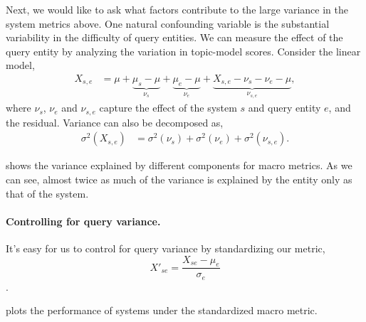 Next, we would like to ask what factors contribute to the large variance in the system metrics above.
One natural confounding variable is the substantial variability in the difficulty of query entities.
We can measure the effect of the query entity by analyzing the variation in topic-model scores.
Consider the linear model,
\begin{align*}
  X_{s,e} &= \mu 
    + \underbrace{\mu_{s} - \mu}_{\nu_{s}}
    + \underbrace{\mu_{e} - \mu}_{\nu_{e}}
    + \underbrace{X_{s,e} - \nu_{s} - \nu_{e} - \mu}_{\nu_{s,e}},
\end{align*}
where $\nu_{s}$, $\nu_{e}$ and $\nu_{s,e}$ capture the effect of the system $s$ and query entity $e$, and the residual.
Variance can also be decomposed as,
\begin{align*}
  \sigma^2(X_{s,e}) &= \sigma^2(\nu_s) + \sigma^2(\nu_e) + \sigma^2(\nu_{s,e}).
\end{align*}

\tableref{} shows the variance explained by different components for macro metrics. As we can see, almost twice as much of the variance is explained by the entity only as that of the system.


\paragraph{Controlling for query variance.}

It's easy for us to control for query variance by standardizing our metric,  
$$X'_{se} = \frac{X_{se} - \mu_e}{\sigma_e}$$.

 plots the performance of systems under the standardized macro \fone metric.


